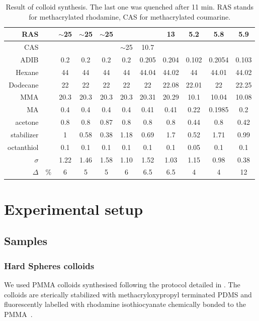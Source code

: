 \begin{table}
	\centering
	
	\begin{tabular}{|r|c|c|c|c|c|c|c|c|c|c|}
	\hline RAS & \milli\gram & $\sim$25 & $\sim$25 & $\sim$25 &  &  & 13 & 5.2 & 5.8 & 5.9 \\ 
	\hline CAS & \milli\gram &  &  &  & $\sim$25 & 10.7 &  &  &  &  \\ 
	\hline \ac{ADIB} & \gram & 0.2 & 0.2 & 0.2 & 0.2 & 0.205 & 0.204 & 0.102 & 0.2054 & 0.103 \\ 
	\hline Hexane & \gram & 44 & 44 & 44 & 44 & 44.04 & 44.02 & 44 & 44.01 & 44.02 \\ 
	\hline Dodecane & \gram & 22 & 22 & 22 & 22 & 22 & 22.08 & 22.01 & 22 & 22.25 \\ 
	\hline \ac{MMA} & \gram & 20.3 & 20.3 & 20.3 & 20.3 & 20.31 & 20.29 & 10.1 & 10.04 & 10.08 \\ 
	\hline \ac{MA} & \gram & 0.4 & 0.4 & 0.4 & 0.4 & 0.41 & 0.41 & 0.22 & 0.1985 & 0.2 \\ 
	\hline acetone & \gram & 0.8 & 0.8 & 0.87 & 0.8 & 0.8 & 0.8 & 0.44 & 0.8 & 0.42 \\ 
	\hline stabilizer & \gram & 1 & 0.58 & 0.38 & 1.18 & 0.69 & 1.7 & 0.52 & 1.71 & 0.99 \\ 
	\hline octanthiol & \milli\litre & 0.1 & 0.1 & 0.1 & 0.1 & 0.1 & 0.1 & 0.05 & 0.1 & 0.1 \\ 
	\hline $\sigma$ & \micro\metre & 1.22 & 1.46 & 1.58 & 1.10 & 1.52 & 1.03 & 1.15 & 0.98 & 0.38 \\ 
	\hline $\Delta$ & $\%$ & 6 & 5 & 5 & 6 & 6.5 & 6.5 & 4 & 4 & 12 \\ 
	\hline 
	\end{tabular} 
	
	\caption{Result of colloid synthesis. The last one was quenched after 11 min. RAS stands for methacrylated rhodamine, CAS for methacrylated coumarine.}
	\label{tab:Result-of-synthesis}
\end{table}

\section{Experimental setup}


\subsection{Samples}
\label{sec:samples}

\subsubsection{Hard Spheres colloids}
\label{subsec:colloids}
We used \ac{PMMA} colloids synthesised following the protocol detailed in . The colloids are sterically stabilized with methacryloxypropyl terminated PDMS and fluorescently labelled with rhodamine isothiocyanate chemically bonded to the \ac{PMMA}~\citep{bosma2002}.


